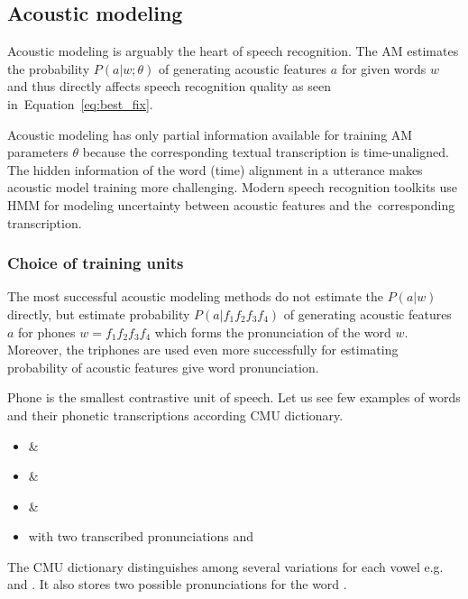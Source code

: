 
\subsection{Acoustic modeling}
\label{sub:am}
Acoustic modeling is arguably the heart of speech recognition.
The \ac{AM} estimates the probability $P(a|w; \theta)$ of generating acoustic features $a$ for given words $w$ and thus directly affects speech recognition quality as seen in~Equation~\ref{eq:best_fix}.

Acoustic modeling has only partial information available for training \ac{AM} parameters $\theta$ because the corresponding textual transcription is time-unaligned.
The hidden information of the word (time) alignment in a utterance makes acoustic model training more challenging.
Modern speech recognition toolkits use \acl{HMM} for modeling uncertainty between acoustic features and the~corresponding transcription. 

\subsubsection*{Choice of training units}
The most successful acoustic modeling methods do not estimate the $P(a|w)$ directly, but estimate probability $P(a|f_1f_2f_3f_4)$ of generating acoustic features $a$ for phones $w=f_1f_2f_3f_4$ which forms the pronunciation of the word $w$. Moreover, the triphones are used even more successfully for estimating probability of acoustic features give word pronunciation.

Phone is the smallest contrastive unit of speech. 
Let us see few examples of words and their phonetic transcriptions according CMU dictionary\cite{weide1998cmu}.
\begin{itemize}
    \item {} \& 
    \item {} \& 
    \item {} \& 
    \item {} with two transcribed pronunciations  and 
\end{itemize}
The CMU dictionary distinguishes among several variations for each vowel e.g.  and .
It also stores two possible pronunciations for the word .

